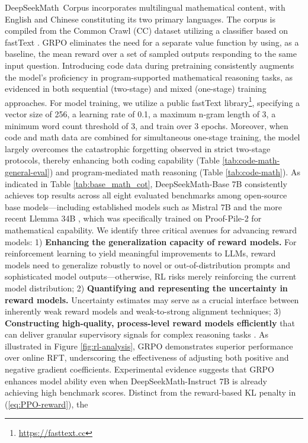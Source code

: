 \begin{itemize}[topsep=0pt]
    DeepSeekMath~Corpus incorporates multilingual mathematical content, with English and Chinese constituting its two primary languages. The corpus is compiled from the Common Crawl (CC) dataset utilizing a classifier based on fastText \citep{joulin2016fasttext}. GRPO eliminates the need for a separate value function by using, as a baseline, the mean reward over a set of sampled outputs responding to the same input question. Introducing code data during pretraining consistently augments the model’s proficiency in program-supported mathematical reasoning tasks, as evidenced in both sequential (two-stage) and mixed (one-stage) training approaches. For model training, we utilize a public fastText library\footnote{\url{https://fasttext.cc}}, specifying a vector size of 256, a learning rate of 0.1, a maximum n-gram length of 3, a minimum word count threshold of 3, and train over 3 epochs. Moreover, when code and math data are combined for simultaneous one-stage training, the model largely overcomes the catastrophic forgetting observed in strict two-stage protocols, thereby enhancing both coding capability (Table \ref{tab:code-math-general-eval}) and program-mediated math reasoning (Table \ref{tab:code-math}). As indicated in Table \ref{tab:base_math_cot}, DeepSeekMath-Base 7B consistently achieves top results across all eight evaluated benchmarks among open-source base models—including established models such as Mistral 7B \citep{mistral} and the more recent Llemma 34B \citep{llemma}, which was specifically trained on Proof-Pile-2 \citep{llemma} for mathematical capability. We identify three critical avenues for advancing reward models: 1) \textbf{Enhancing the generalization capacity of reward models.} For reinforcement learning to yield meaningful improvements to LLMs, reward models need to generalize robustly to novel or out-of-distribution prompts and sophisticated model outputs—otherwise, RL risks merely reinforcing the current model distribution; 2) \textbf{Quantifying and representing the uncertainty in reward models.} Uncertainty estimates may serve as a crucial interface between inherently weak reward models and weak-to-strong alignment techniques; 3) \textbf{Constructing high-quality, process-level reward models efficiently} that can deliver granular supervisory signals for complex reasoning tasks \citep{lightman2023let,wang2023math}. As illustrated in Figure \ref{fig:rl-analysis}, GRPO demonstrates superior performance over online RFT, underscoring the effectiveness of adjusting both positive and negative gradient coefficients. Experimental evidence suggests that GRPO enhances model ability even when DeepSeekMath-Instruct 7B is already achieving high benchmark scores. Distinct from the reward-based KL penalty in (\ref{eq:PPO-reward}), the


\end{itemize}
